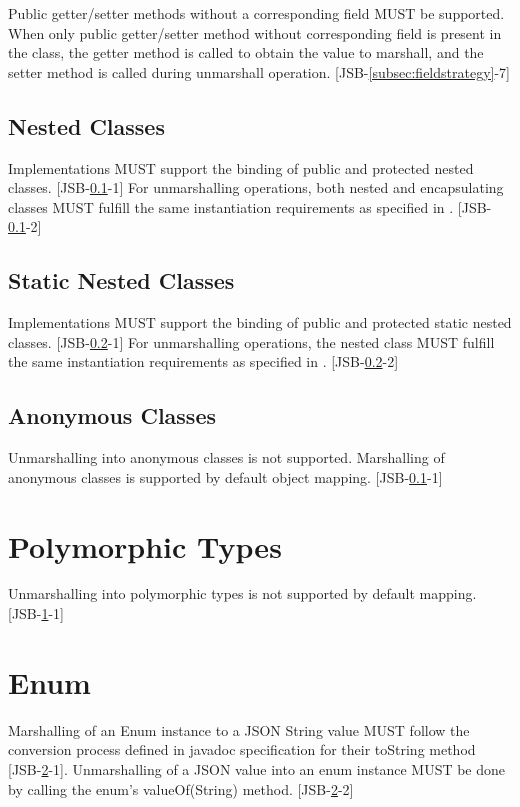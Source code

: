 Public getter/setter methods without a corresponding field MUST be supported. 
When only public getter/setter method without corresponding field is present in the class, the getter method is called to obtain the value to marshall, and the setter method is called during unmarshall operation. [JSB-\ref{subsec:fieldstrategy}-7]

\subsection{Nested Classes}
\label{subsec:nestedclass}
Implementations MUST support the binding of public and protected nested classes. [JSB-\ref{subsec:nestedclass}-1] 
For unmarshalling operations, both nested and encapsulating classes MUST fulfill the same instantiation requirements as specified in . [JSB-\ref{subsec:nestedclass}-2]

\subsection{Static Nested Classes}
\label{subsec:staticnested}
Implementations MUST support the binding of public and protected static nested classes. [JSB-\ref{subsec:staticnested}-1] 
For unmarshalling operations, the nested class MUST fulfill the same instantiation requirements as specified in . [JSB-\ref{subsec:staticnested}-2]

\subsection{Anonymous Classes}
\label{subsec:anonymous}
Unmarshalling into anonymous classes is not supported. Marshalling of anonymous classes is supported by default object mapping. [JSB-\ref{subsec:nestedclass}-1]

\section{Polymorphic Types}
\label{sec:polymorph}
Unmarshalling into polymorphic types is not supported by default mapping. [JSB-\ref{sec:polymorph}-1]

\section{Enum}
\label{sec:enum}
Marshalling of an Enum instance to a JSON String value 
MUST follow the conversion process defined in javadoc specification for their toString method [JSB-\ref{sec:enum}-1]. 
Unmarshalling of a JSON value into an enum instance MUST be done by calling the enum's valueOf(String) method. [JSB-\ref{sec:enum}-2]

